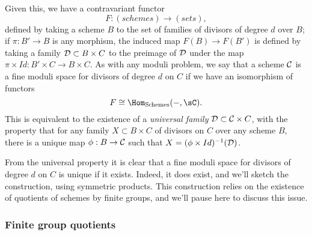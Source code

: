 Given this, we have a contravariant functor 
$$
F : (schemes) \to (sets),
$$
defined by taking a scheme $B$ to the set of families of divisors of degree $d$ over $B$; if $\pi : B' \to B$ is any morphism, the induced map $F(B) \to F(B')$ is defined by taking a family $\cD \subset B \times C$ to the preimage of $\cD$ under the map $\pi \times Id : B' \times C \to B \times C$. As with any moduli problem, we say that a scheme $\cC$ is a fine moduli space for divisors of degree $d$ on $C$ if we have an isomorphism of functors
$$
F \cong \Hom_{\rm{Schemes}}( -, \sC).
$$
This is equivalent to the existence of a \emph{universal family} $\cD \subset \cC \times C$, with the property that for any family $X \subset B \times C$ of divisors on $C$ over any scheme $B$, there is a unique map $\phi : B \to \cC$ such that $X = (\phi \times Id)^{-1}(\cD)$.

From the universal property it is clear that a fine moduli space for divisors of degree $d$ on $C$ is unique if it exists. Indeed, it does exist, and we'll sketch the construction, using symmetric products. This construction relies on the existence of quotients of schemes by finite groups, and we'll pause here to discuss this issue.


%
%

\subsubsection{Finite group quotients}


